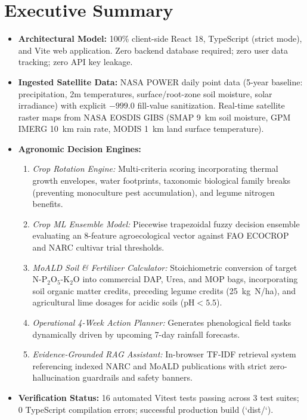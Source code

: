 \documentclass[11pt,a4paper]{report}
\begin{document}
\chapter*{Executive Summary}
\begin{itemize}
  \item \textbf{Architectural Model:} 100\% client-side React 18, TypeScript (strict mode), and Vite web application. Zero backend database required; zero user data tracking; zero API key leakage.
  \item \textbf{Ingested Satellite Data:} NASA POWER daily point data (5-year baseline: precipitation, 2m temperatures, surface/root-zone soil moisture, solar irradiance) with explicit $-999.0$ fill-value sanitization. Real-time satellite raster maps from NASA EOSDIS GIBS (SMAP 9~km soil moisture, GPM IMERG 10~km rain rate, MODIS 1~km land surface temperature).
  \item \textbf{Agronomic Decision Engines:}
  \begin{enumerate}
    \item \textit{Crop Rotation Engine:} Multi-criteria scoring incorporating thermal growth envelopes, water footprints, taxonomic biological family breaks (preventing monoculture pest accumulation), and legume nitrogen benefits.
    \item \textit{Crop ML Ensemble Model:} Piecewise trapezoidal fuzzy decision ensemble evaluating an 8-feature agroecological vector against FAO ECOCROP and NARC cultivar trial thresholds.
    \item \textit{MoALD Soil \& Fertilizer Calculator:} Stoichiometric conversion of target N-P$_2$O$_5$-K$_2$O into commercial DAP, Urea, and MOP bags, incorporating soil organic matter credits, preceding legume credits (25~kg~N/ha), and agricultural lime dosages for acidic soils ($\text{pH} < 5.5$).
    \item \textit{Operational 4-Week Action Planner:} Generates phenological field tasks dynamically driven by upcoming 7-day rainfall forecasts.
    \item \textit{Evidence-Grounded RAG Assistant:} In-browser TF-IDF retrieval system referencing indexed NARC and MoALD publications with strict zero-hallucination guardrails and safety banners.
  \end{enumerate}
  \item \textbf{Verification Status:} 16 automated Vitest tests passing across 3 test suites; 0 TypeScript compilation errors; successful production build (`dist/`).
\end{itemize}
\end{document}
